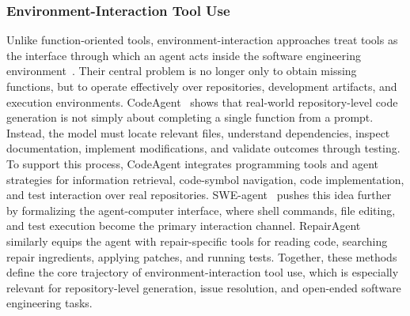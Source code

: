\subsubsection{Environment-Interaction Tool Use}
Unlike function-oriented tools, environment-interaction approaches treat tools as the interface through which an agent acts inside the software engineering environment~\cite{li2026environment,chen2026grounded,song2026envscaler,gao2026teaching}. Their central problem is no longer only to obtain missing functions, but to operate effectively over repositories, development artifacts, and execution environments. CodeAgent~\cite{zhang2024codeagent} shows that real-world repository-level code generation is not simply about completing a single function from a prompt. Instead, the model must locate relevant files, understand dependencies, inspect documentation, implement modifications, and validate outcomes through testing. To support this process, CodeAgent integrates programming tools and agent strategies for information retrieval, code-symbol navigation, code implementation, and test interaction over real repositories. SWE-agent~\cite{yang2024swe} pushes this idea further by formalizing the agent-computer interface, where shell commands, file editing, and test execution become the primary interaction channel. RepairAgent~\cite{bouzenia2025repairagent} similarly equips the agent with repair-specific tools for reading code, searching repair ingredients, applying patches, and running tests. Together, these methods define the core trajectory of environment-interaction tool use, which is especially relevant for repository-level generation, issue resolution, and open-ended software engineering tasks.


